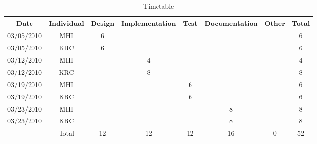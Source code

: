 \begin{table}
\begin{center}
\begin{tabular}{c|c|c|c|c|c|c|c}
Date & Individual & Design & Implementation & Test & Documentation & Other & Total\tabularnewline
\hline
\hline 
03/05/2010 & MHI & 6 &  &  &  &  & 6\tabularnewline
\hline 
03/05/2010 & KRC & 6 &  &  &  &  & 6\tabularnewline
\hline 
03/12/2010 & MHI &  & 4 &  &  &  & 4\tabularnewline
\hline 
03/12/2010 & KRC &  & 8 &  &  &  & 8\tabularnewline
\hline 
03/19/2010 & MHI &  &  & 6 &  &  & 6\tabularnewline
\hline 
03/19/2010 & KRC &  &  & 6 &  &  & 6\tabularnewline
\hline 
03/23/2010 & MHI &  &  &  & 8 &  & 8\tabularnewline
\hline 
03/23/2010 & KRC &  &  &  & 8 &  & 8\tabularnewline
\hline
\hline 
 & Total & 12 & 12 & 12 & 16 & 0 & 52\tabularnewline
\cline{2-8} 
\end{tabular}
\caption{Timetable \label{table:timetable} }
\end{center}
\end{table}